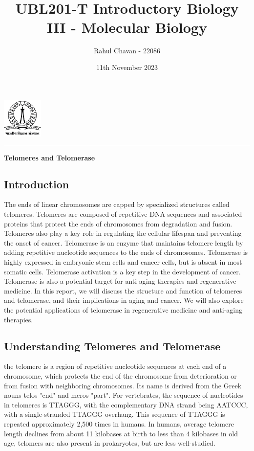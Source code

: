 \documentclass{report}
\title{\textbf{UBL201-T Introductory Biology III - Molecular Biology}}
\author{Rahul Chavan - 22086}
\date{11th November 2023}
\renewcommand{\maketitle}{
 \begin{center}
    \includegraphics[width=2cm]{IISc_Master_Seal_Black.jpg}
    \vspace{0.5cm}

    \Large
    \textbf{\thetitle}
    
    \vspace{0.5cm}
    
    \Large
    \theauthor
    
    \vspace{0.2cm}
    
    \large
    \thedate

    \vspace{0.5cm}

    \hrule  
    
  \end{center}
}
\begin{document}
\maketitle
\begin{center}
    \Large
    \textbf{Telomeres and Telomerase}
\end{center} 

\subsection*{Introduction}

The ends of linear chromosomes are capped by specialized structures called telomeres. 
Telomeres are composed of repetitive DNA sequences and associated proteins that protect 
the ends of chromosomes from degradation and fusion. Telomeres also play a key role in 
regulating the cellular lifespan and preventing the onset of cancer. Telomerase is an 
enzyme that maintains telomere length by adding repetitive nucleotide sequences to the 
ends of chromosomes. Telomerase is highly expressed in embryonic stem cells and cancer cells, 
but is absent in most somatic cells. Telomerase activation is a key step in the development of cancer. 
Telomerase is also a potential target for anti-aging therapies and regenerative medicine. 
In this report, we will discuss the structure and function of telomeres and telomerase, 
and their implications in aging and cancer. We will also explore the potential applications 
of telomerase in regenerative medicine and anti-aging therapies.






\subsection*{Understanding Telomeres and Telomerase}

the telomere is a region of repetitive nucleotide sequences at each end of a chromosome,
which protects the end of the chromosome from deterioration or from fusion with neighboring chromosomes.
Its name is derived from the Greek nouns telos "end" and meros "part".
For vertebrates, the sequence of nucleotides in telomeres is TTAGGG, with the complementary DNA strand being AATCCC, with a single-stranded TTAGGG overhang.
This sequence of TTAGGG is repeated approximately 2,500 times in humans.
In humans, average telomere length declines from about 11 kilobases at birth to less than 4 kilobases in old age,
telomers are also present in prokaryotes, but are less well-studied.
\end{document}
